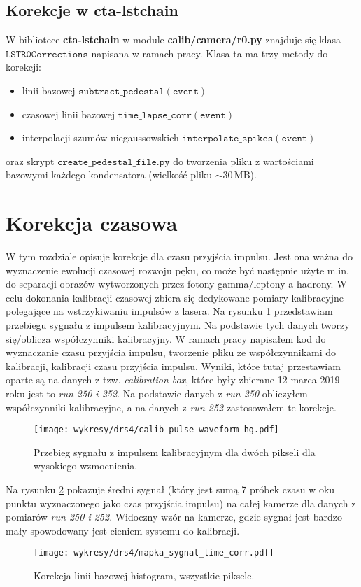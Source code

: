 \documentclass[a4paper,11pt,twoside]{article}
\begin{document}
\subsection{Korekcje w cta-lstchain}
W bibliotece {\bf{cta-lstchain}} w module {\bf{calib/camera/r0.py}} znajduje się klasa $\mathtt{LSTR0Corrections}$ napisana w ramach pracy. Klasa ta ma trzy metody do korekcji:
\begin{itemize}
\item linii bazowej $\mathtt{subtract\_pedestal(event)}$
\item czasowej linii bazowej $\mathtt{time\_lapse\_corr(event)}$
\item interpolacji szumów niegaussowskich $\mathtt{interpolate\_spikes(event)}$
\end{itemize}
oraz skrypt $\mathtt{create\_pedestal\_file.py}$ do tworzenia pliku z wartościami bazowymi każdego kondensatora (wielkość pliku $\sim$30\,MB).
\newpage
\section{Korekcja czasowa}
W tym rozdziale opisuje korekcje dla czasu przyjścia impulsu. Jest ona ważna do wyznaczenie ewolucji czasowej rozwoju pęku, co może być następnie użyte m.in. do separacji obrazów wytworzonych przez fotony gamma/leptony a hadrony. 
W celu dokonania kalibracji czasowej zbiera się dedykowane pomiary kalibracyjne polegające na wstrzykiwaniu impulsów z lasera. Na rysunku \ref{fig:calib_waveform_hg} przedstawiam przebiegu sygnału z impulsem kalibracyjnym.  Na podstawie tych danych tworzy się/oblicza współczynniki kalibracyjny. W ramach pracy napisałem kod do wyznaczanie czasu przyjścia impulsu, tworzenie pliku ze współczynnikami do kalibracji, kalibracji czasu przyjścia impulsu. Wyniki, które tutaj przestawiam oparte są na danych z tzw. \textsl{calibration box}, które były zbierane 12 marca 2019 roku jest to \textsl{run 250 i 252}. Na podstawie danych z \textsl{run 250} obliczyłem współczynniki kalibracyjne, a na danych z \textsl{run 252} zastosowałem te korekcje. 
\begin{figure}[H] 
\centering
\texttt{[image: wykresy/drs4/calib\_pulse\_waveform\_hg.pdf]}
\caption{Przebieg sygnału z impulsem kalibracyjnym dla dwóch pikseli dla wysokiego wzmocnienia.}
\label{fig:calib_waveform_hg}
\end{figure}
Na rysunku \ref{fig:signal_map} pokazuje średni sygnał (który jest sumą 7 próbek czasu w oku punktu wyznaczonego jako czas przyjścia impulsu) na całej kamerze dla danych z pomiarów \textsl{run 250 i 252}. Widoczny wzór na kamerze, gdzie sygnał jest bardzo mały spowodowany jest cieniem systemu do kalibracji.
\begin{figure}[H] 
\centering
\texttt{[image: wykresy/drs4/mapka\_sygnal\_time\_corr.pdf]}
\caption{Korekcja linii bazowej histogram, wszystkie piksele.}
\label{fig:signal_map}
\end{figure}
\end{document}
